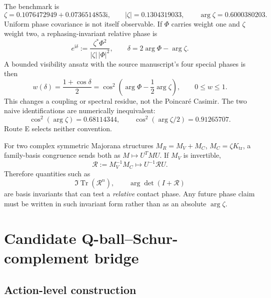 \documentclass[11pt]{article}
\numberwithin{equation}{section}
\newcommand{\Ktr}{K_{\mathrm{tr}}}
\newcommand{\ii}{\mathrm i}
\newcommand{\Tr}{\operatorname{Tr}}
\begin{document}
The benchmark is
\begin{equation}
 \zeta=0.1076472949+0.0736514853\ii,\qquad
 |\zeta|=0.1304319033,\qquad \arg\zeta=0.6000380203.
 \label{eq:zetabench}
\end{equation}
Uniform phase covariance is not itself observable.  If \(\Phi\) carries
weight one and \(\zeta\) weight two, a rephasing-invariant relative phase is
\begin{equation}
 e^{\ii\delta}:=
 \frac{\zeta^*\Phi^2}{|\zeta|\,|\Phi|^2},
 \qquad \delta=2\arg\Phi-\arg\zeta.
 \label{eq:relativephase}
\end{equation}
A bounded visibility ansatz with the source manuscript's four special phases
is then
\begin{equation}
 w(\delta)=\frac{1+\cos\delta}{2}
 =\cos^2\!\left(\arg\Phi-\frac12\arg\zeta\right),
 \qquad 0\le w\le1.
 \label{eq:visibility}
\end{equation}
This changes a coupling or spectral residue, not the Poincar\'e Casimir.  The
two naive identifications are numerically inequivalent:
\begin{equation}
 \cos^2(\arg\zeta)=0.68114344,\qquad
 \cos^2(\arg\zeta/2)=0.91265707.
\end{equation}
Route E selects neither convention.

For two complex symmetric Majorana structures
\(M_R=M_V+M_C\), \(M_C=\zeta\Ktr\), a family-basis congruence sends both as
\(M\mapsto U^TMU\).  If \(M_V\) is invertible,
\begin{equation}
 \mathcal R:=M_V^{-1}M_C\mapsto U^{-1}\mathcal R U.
\end{equation}
Therefore quantities such as
\begin{equation}
 \Im\Tr(\mathcal R^n),\qquad \arg\det(I+\mathcal R)
 \label{eq:phaseinvariants}
\end{equation}
are basis invariants that can test a \emph{relative} contact phase.  Any
future phase claim must be written in such invariant form rather than as an
absolute \(\arg\zeta\).

\section{Candidate Q-ball--Schur-complement bridge}

\subsection{Action-level construction}
\end{document}
